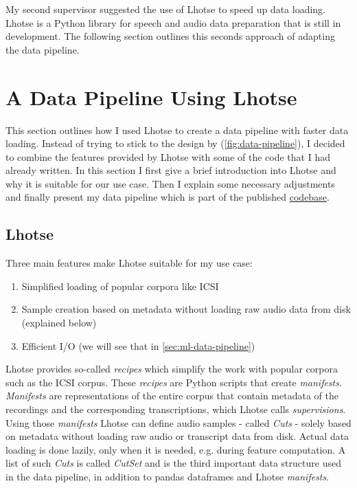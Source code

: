 \documentclass[bsc,frontabs,parskip,deptreport]{infthesis}
\newcommand{\coderepo}{\href{https://github.com/LasseWolter/laughter-detection-icsi}{codebase}}
\begin{document}
My second supervisor suggested the use of Lhotse \citep{zelasko2021lhotse} to speed up data loading. Lhotse is a Python library for speech and audio data preparation that is still in development. The following section outlines this seconds approach of adapting the data pipeline.

\section{A Data Pipeline Using Lhotse}
This section outlines how I used Lhotse to create a data pipeline with faster data loading. Instead of trying to stick to the design by \citet{gillick2021robust} (\autoref{fig:data-pipeline}), I decided to combine the features provided by Lhotse with some of the code that I had already written. 
In this section I first give a brief introduction into Lhotse and why it is suitable for our use case. Then I explain some necessary adjustments and finally present my data pipeline which is part of the published \coderepo.

\subsection{Lhotse} \label{sec:lhotse}
Three main features make Lhotse suitable for my use case:
\begin{enumerate}
    \item Simplified loading of popular corpora like ICSI
    \item Sample creation based on metadata without loading raw audio data from disk (explained below)
    \item Efficient I/O (we will see that in \autoref{sec:ml-data-pipeline}) 
\end{enumerate}

Lhotse provides so-called \textit{recipes} which simplify the work with popular corpora such as the ICSI corpus.
These \textit{recipes} are Python scripts that create \textit{manifests}.
\textit{Manifests} are representations of the entire corpus that contain metadata of the recordings and the corresponding transcriptions, which Lhotse calls \textit{supervisions}.
Using those \textit{manifests} Lhotse can define audio samples - called \textit{Cuts} - solely based on metadata without loading raw audio or transcript data from disk. Actual data loading is done lazily, only when it is needed, e.g. during feature computation. 
A list of such \textit{Cuts} is called \textit{CutSet} and is the third important data structure used in the data pipeline, in addition to pandas dataframes and Lhotse \textit{manifests}. 
\end{document}
